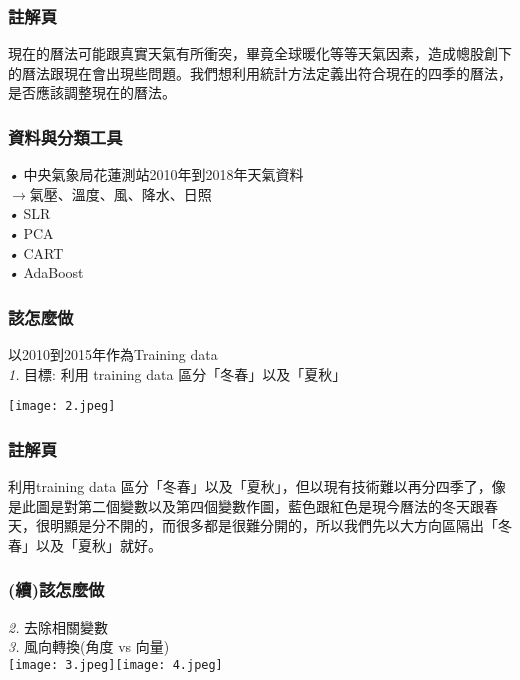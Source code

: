 \documentclass{beamer}
\begin{document}
\begin{frame}
\frametitle{註解頁}
\hspace*{4mm} 現在的曆法可能跟真實天氣有所衝突，畢竟全球暖化等等天氣因素，造成幒股創下的曆法跟現在會出現些問題。我們想利用統計方法定義出符合現在的四季的曆法，是否應該調整現在的曆法。\\

\end{frame}

\begin{frame}
\frametitle{資料與分類工具}
\emph{•} 中央氣象局花蓮測站2010年到2018年天氣資料\\
$\rightarrow$氣壓、溫度、風、降水、日照\\
\emph{•} SLR\\
\emph{•} PCA\\
\emph{•} CART\\
\emph{•} AdaBoost

\end{frame}
\begin{frame}
\frametitle{該怎麼做}
以2010到2015年作為Training data\\
\emph{1. }目標: 利用 training data 區分「冬春」以及「夏秋」\\
\begin{center}
\texttt{[image: 2.jpeg]}\\
\end{center}
\end{frame}

\begin{frame}
\frametitle{註解頁}
\hspace*{4mm} 利用training data 區分「冬春」以及「夏秋」，但以現有技術難以再分四季了，像是此圖是對第二個變數以及第四個變數作圖，藍色跟紅色是現今曆法的冬天跟春天，很明顯是分不開的，而很多都是很難分開的，所以我們先以大方向區隔出「冬春」以及「夏秋」就好。\\

\end{frame}

\begin{frame}
\frametitle{(續)該怎麼做}
\emph{2. }去除相關變數\\
\emph{3. }風向轉換(角度 vs 向量)\\
\texttt{[image: 3.jpeg]}\texttt{[image: 4.jpeg]}\\
\end{frame}
\end{document}
